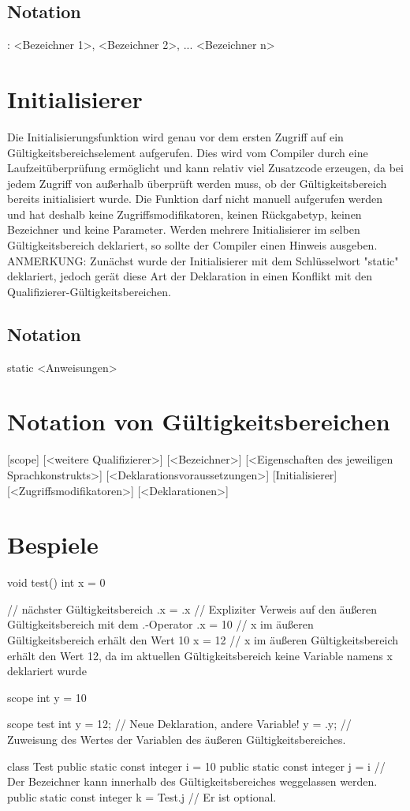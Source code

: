 \subsection{Notation}
: <Bezeichner 1>, <Bezeichner 2>, ... <Bezeichner n>

\section{Initialisierer}
Die Initialisierungsfunktion wird genau vor dem ersten Zugriff auf ein Gültigkeitsbereichselement aufgerufen.
Dies wird vom Compiler durch eine Laufzeitüberprüfung ermöglicht und kann relativ viel Zusatzcode erzeugen, da bei jedem Zugriff von außerhalb
überprüft werden muss, ob der Gültigkeitsbereich bereits initialisiert wurde.
Die Funktion darf nicht manuell aufgerufen werden und hat deshalb keine Zugriffsmodifikatoren, keinen Rückgabetyp, keinen Bezeichner und keine Parameter.
Werden mehrere Initialisierer im selben Gültigkeitsbereich deklariert, so sollte der Compiler einen Hinweis ausgeben.
ANMERKUNG: Zunächst wurde der Initialisierer mit dem Schlüsselwort "static" deklariert, jedoch gerät diese Art der Deklaration in einen Konflikt mit
den Qualifizierer-Gültigkeitsbereichen.

\subsection{Notation}
static
	<Anweisungen>

\section{Notation von Gültigkeitsbereichen}
[scope] [<weitere Qualifizierer>] [<Bezeichner>] [<Eigenschaften des jeweiligen Sprachkonstrukts>] [<Deklarationsvoraussetzungen>]
	[Initialisierer]
	[<Zugriffsmodifikatoren>] [<Deklarationen>]

\section{Bespiele}
void test()
	int x = 0

	// nächster Gültigkeitsbereich
		.x = .x // Expliziter Verweis auf den äußeren Gültigkeitsbereich mit dem .-Operator
		.x = 10 // x im äußeren Gültigkeitsbereich erhält den Wert 10
		x = 12 // x im äußeren Gültigkeitsbereich erhält den Wert 12, da im aktuellen Gültigkeitsbereich keine Variable namens x deklariert wurde

scope
	int y = 10

	scope test
		int y = 12; // Neue Deklaration, andere Variable!
		y = .y; // Zuweisung des Wertes der Variablen des äußeren Gültigkeitsbereiches.

class Test
	public static const integer i = 10
	public static const integer j = i // Der Bezeichner kann innerhalb des Gültigkeitsbereiches weggelassen werden.
	public static const integer k = Test.j // Er ist optional.